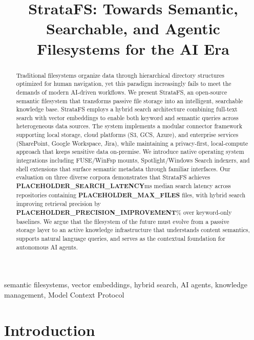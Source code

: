 \documentclass[conference]{IEEEtran}
\begin{document}
\title{StrataFS: Towards Semantic, Searchable, and Agentic Filesystems for the AI Era}

\author{
}

\maketitle

\begin{abstract}
Traditional filesystems organize data through hierarchical directory structures optimized for human navigation, yet this paradigm increasingly fails to meet the demands of modern AI-driven workflows. We present StrataFS, an open-source semantic filesystem that transforms passive file storage into an intelligent, searchable knowledge base. StrataFS employs a hybrid search architecture combining full-text search with vector embeddings to enable both keyword and semantic queries across heterogeneous data sources. The system implements a modular connector framework supporting local storage, cloud platforms (S3, GCS, Azure), and enterprise services (SharePoint, Google Workspace, Jira), while maintaining a privacy-first, local-compute approach that keeps sensitive data on-premise. We introduce native operating system integrations including FUSE/WinFsp mounts, Spotlight/Windows Search indexers, and shell extensions that surface semantic metadata through familiar interfaces. Our evaluation on three diverse corpora demonstrates that StrataFS achieves \textbf{PLACEHOLDER\_SEARCH\_LATENCY}ms median search latency across repositories containing \textbf{PLACEHOLDER\_MAX\_FILES} files, with hybrid search improving retrieval precision by \textbf{PLACEHOLDER\_PRECISION\_IMPROVEMENT}\% over keyword-only baselines. We argue that the filesystem of the future must evolve from a passive storage layer to an active knowledge infrastructure that understands content semantics, supports natural language queries, and serves as the contextual foundation for autonomous AI agents.
\end{abstract}

\begin{IEEEkeywords}
semantic filesystems, vector embeddings, hybrid search, AI agents, knowledge management, Model Context Protocol
\end{IEEEkeywords}

\section{Introduction}
\end{document}

